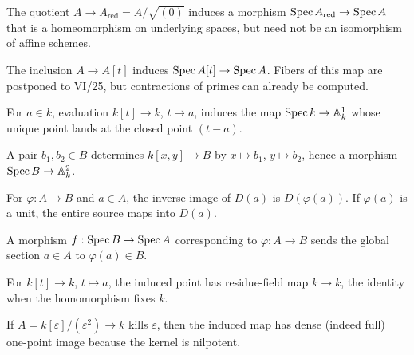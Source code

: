 \begin{example}
The quotient $A\to A_{\mathrm{red}}=A/\sqrt{(0)}$ induces a morphism $\operatorname{Spec} A_{\mathrm{red}}\to\operatorname{Spec} A$ that is a homeomorphism on underlying spaces, but need not be an isomorphism of affine schemes.
\end{example}

\begin{example}
The inclusion $A\to A[t]$ induces $\operatorname{Spec} A[t]\to\operatorname{Spec} A$.  Fibers of this map are postponed to VI/25, but contractions of primes can already be computed.
\end{example}

\begin{example}
For $a\in k$, evaluation $k[t]\to k$, $t\mapsto a$, induces the map $\operatorname{Spec} k\to\mathbb A^1_k$ whose unique point lands at the closed point $(t-a)$.
\end{example}

\begin{example}
A pair $b_1,b_2\in B$ determines $k[x,y]\to B$ by $x\mapsto b_1$, $y\mapsto b_2$, hence a morphism $\operatorname{Spec} B\to\mathbb A^2_k$.
\end{example}

\begin{example}
For $\varphi:A\to B$ and $a\in A$, the inverse image of $D(a)$ is $D(\varphi(a))$.  If $\varphi(a)$ is a unit, the entire source maps into $D(a)$.
\end{example}

\begin{example}
A morphism $f:\operatorname{Spec} B\to\operatorname{Spec} A$ corresponding to $\varphi:A\to B$ sends the global section $a\in A$ to $\varphi(a)\in B$.
\end{example}

\begin{example}
For $k[t]\to k$, $t\mapsto a$, the induced point has residue-field map $k\to k$, the identity when the homomorphism fixes $k$.
\end{example}

\begin{example}
If $A=k[\varepsilon]/(\varepsilon^2)\to k$ kills $\varepsilon$, then the induced map has dense (indeed full) one-point image because the kernel is nilpotent.
\end{example}

